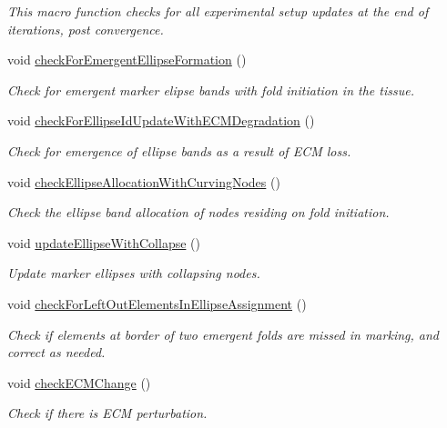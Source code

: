 \begin{DoxyCompactItemize}
\begin{DoxyCompactList}\small\item\em This macro function checks for all experimental setup updates at the end of iterations, post convergence. \end{DoxyCompactList}\item 
void \hyperlink{classSimulation_a49ebb11d5727f0a6fc3ebfe8166b7290}{check\+For\+Emergent\+Ellipse\+Formation} ()
\begin{DoxyCompactList}\small\item\em Check for emergent marker elipse bands with fold initiation in the tissue. \end{DoxyCompactList}\item 
void \hyperlink{classSimulation_aba7aa0ded1d2cd262ed08c8abddde4f8}{check\+For\+Ellipse\+Id\+Update\+With\+E\+C\+M\+Degradation} ()
\begin{DoxyCompactList}\small\item\em Check for emergence of ellipse bands as a result of E\+C\+M loss. \end{DoxyCompactList}\item 
void \hyperlink{classSimulation_a1cf2aca93cb0f8716817936d98b6bf0e}{check\+Ellipse\+Allocation\+With\+Curving\+Nodes} ()
\begin{DoxyCompactList}\small\item\em Check the ellipse band allocation of nodes residing on fold initiation. \end{DoxyCompactList}\item 
void \hyperlink{classSimulation_a0e7040a8ecc377bd2e53c785fc4c488b}{update\+Ellipse\+With\+Collapse} ()
\begin{DoxyCompactList}\small\item\em Update marker ellipses with collapsing nodes. \end{DoxyCompactList}\item 
void \hyperlink{classSimulation_a065f2150d785ee160762367bd6419e42}{check\+For\+Left\+Out\+Elements\+In\+Ellipse\+Assignment} ()
\begin{DoxyCompactList}\small\item\em Check if elements at border of two emergent folds are missed in marking, and correct as needed. \end{DoxyCompactList}\item 
void \hyperlink{classSimulation_ae096c8a7fcc6e921415d1be317526d02}{check\+E\+C\+M\+Change} ()
\begin{DoxyCompactList}\small\item\em Check if there is E\+C\+M perturbation. \end{DoxyCompactList}\item 

\end{DoxyCompactItemize}
